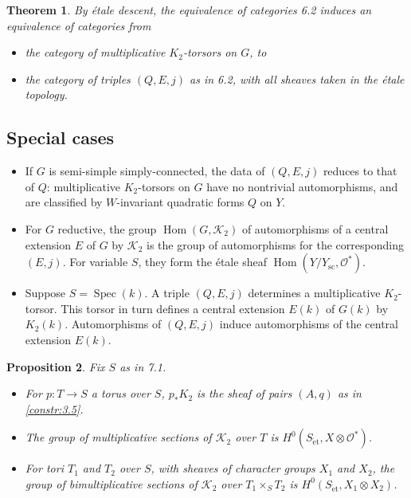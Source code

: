 \documentclass[11pt,a4paper]{article}
\theoremstyle{plain}
\newtheorem{theorem}{Theorem}[section]
\newtheorem{proposition}[theorem]{Proposition}
\theoremstyle{definition}
\DeclareMathOperator{\Hom}{Hom}
\DeclareMathOperator{\Spec}{Spec}
\newcommand{\cK}{\mathcal{K}}
\newcommand{\cO}{\mathcal{O}}
\newcommand{\scu}{\mathrm{sc}}
\newcommand{\et}{\mathrm{\acute{e}t}}
\begin{document}
\begin{theorem}\label{thm:7.2}
By \'etale descent, the equivalence of categories 6.2 induces an equivalence of categories from
\begin{itemize}
\item[(i)] the category of multiplicative $K_2$-torsors on $G$, to
\item[(ii)] the category of triples $(Q, E, j)$ as in 6.2, with all sheaves taken in the \'etale topology.
\end{itemize}
\end{theorem}

\subsection{Special cases}
\begin{itemize}
\item[(i)] If $G$ is semi-simple simply-connected, the data of $(Q, E, j)$ reduces to that of $Q$: multiplicative $K_2$-torsors on $G$ have no nontrivial automorphisms, and are classified by $W$-invariant quadratic forms $Q$ on $Y$.
\item[(ii)] For $G$ reductive, the group $\Hom(G, \cK_2)$ of automorphisms of a central extension $E$ of $G$ by $\cK_2$ is the group of automorphisms for the corresponding $(E, j)$. For variable $S$, they form the \'etale sheaf $\Hom(Y/Y_\scu, \cO^*)$.
\item[(iii)] Suppose $S = \Spec(k)$. A triple $(Q, E, j)$ determines a multiplicative $K_2$-torsor. This torsor in turn defines a central extension $E(k)$ of $G(k)$ by $K_2(k)$. Automorphisms of $(Q, E, j)$ induce automorphisms of the central extension $E(k)$.
\end{itemize}

\begin{proposition}\label{prop:7.4}
Fix $S$ as in 7.1.
\begin{itemize}
\item[(i)] For $p: T \to S$ a torus over $S$, $p_* K_2$ is the sheaf of pairs $(A, q)$ as in \ref{constr:3.5}.
\item[(ii)] The group of multiplicative sections of $\cK_2$ over $T$ is $H^0(S_\et, X \otimes \cO^*)$.
\item[(iii)] For tori $T_1$ and $T_2$ over $S$, with sheaves of character groups $X_1$ and $X_2$, the group of bimultiplicative sections of $\cK_2$ over $T_1 \times_S T_2$ is $H^0(S_\et, X_1 \otimes X_2)$.
\end{itemize}
\end{proposition}
\end{document}
